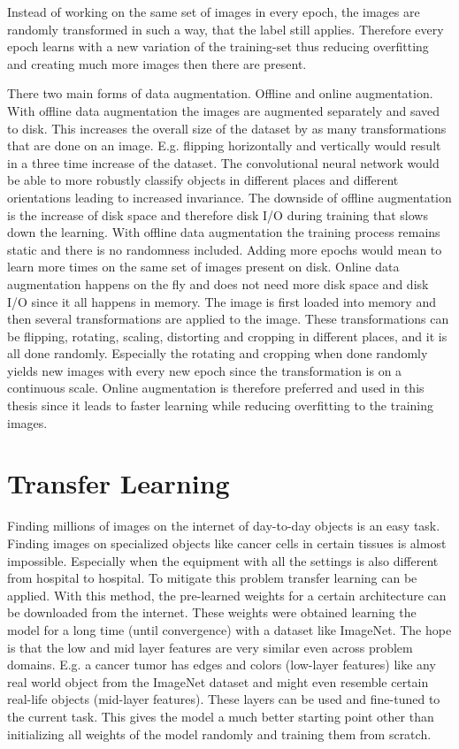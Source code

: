 Instead of working on the same set of images in every epoch, the images are randomly transformed in such a way, that the label still applies. Therefore every epoch learns with a new variation of the training-set thus reducing overfitting and creating much more images then there are present.

There two main forms of data augmentation. Offline and online augmentation. With offline data augmentation the images are augmented separately and saved to disk. This increases the overall size of the dataset by as many transformations that are done on an image. E.g. flipping horizontally and vertically would result in a three time increase of the dataset. The convolutional neural network would be able to more robustly classify objects in different places and different orientations leading to increased invariance. The downside of offline augmentation is the increase of disk space and therefore disk I/O during training that slows down the learning. With offline data augmentation the training process remains static and there is no randomness included. Adding more epochs would mean to learn more times on the same set of images present on disk.
Online data augmentation happens on the fly and does not need more disk space and disk I/O since it all happens in memory. The image is first loaded into memory and then several transformations are applied to the image. These transformations can be flipping, rotating, scaling, distorting and cropping in different places, and it is all done randomly. Especially the rotating and cropping when done randomly yields new images with every new epoch since the transformation is on a continuous scale. Online augmentation is therefore preferred and used in this thesis since it leads to faster learning while reducing overfitting to the training images.

\section{Transfer Learning}

Finding millions of images on the internet of day-to-day objects is an easy task. Finding images on specialized objects like cancer cells in certain tissues is almost impossible. Especially when the equipment with all the settings is also different from hospital to hospital. To mitigate this problem transfer learning can be applied. With this method, the pre-learned weights for a certain architecture can be downloaded from the internet. These weights were obtained learning the model for a long time (until convergence) with a dataset like ImageNet. The hope is that the low and mid layer features are very similar even across problem domains. E.g. a cancer tumor has edges and colors (low-layer features) like any real world object from the ImageNet dataset and might even resemble certain real-life objects (mid-layer features). These layers can be used and fine-tuned to the current task. This gives the model a much better starting point other than initializing all weights of the model randomly and training them from scratch. 

